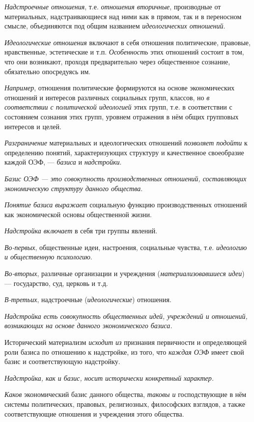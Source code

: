 \documentclass[a4paper,14pt,russian]{extreport}
\begin{document}
\emph{Надстроечные отношения}, т.е. \emph{отношения вторичные}, производные от материальных, надстраивающиеся над ними как в прямом, так и в переносном смысле, объединяются под общим названием \emph{идеологических отношений}.

\emph{Идеологические отношения} включают в себя отношения политические, правовые, нравственные, эстетические и т.п. \emph{Особенность} этих отношений состоит в том, что они возникают, проходя предварительно через общественное сознание, обязательно опосредуясь им.

\emph{Например}, отношения политические формируются на основе экономических отношений и интересов различных социальных групп, классов, но \emph{в соответствии с политической идеологией} этих групп, т.е. в соответствии с состоянием сознания этих групп, уровнем отражения в нём общих групповых интересов и целей.

\emph{Разграничение} материальных и идеологических отношений \emph{позволяет подойти} к определению понятий, характеризующих структуру и качественное своеобразие каждой ОЭФ, --- \emph{базиса} и \emph{надстройки}.

\emph{Базис ОЭФ --- это совокупность производственных отношений, составляющих экономическую структуру данного общества}.

\emph{Понятие базиса} \emph{выражает} социальную функцию производственных отношений как экономической основы общественной жизни.

\emph{Надстройка включает} в себя три группы явлений.

\emph{Во-первых}, общественные идеи, настроения, социальные чувства, т.е. \emph{идеологию и общественную психологию}.

\emph{Во-вторых}, различные организации и учреждения (\emph{материализовавшиеся идеи}) --- государство, суд, церковь и т.д.

\emph{В-третьих}, надстроечные (\emph{идеологические}) отношения.

\emph{Надстройка есть совокупность общественных идей, учреждений и отношений, возникающих на основе данного экономического базиса.}

Исторический материализм \emph{исходит из} признания первичности и определяющей роли базиса по отношению к надстройке, из того, что \emph{каждая ОЭФ} имеет свой базис и соответствующую надстройку.

\emph{Надстройка, как и базис, носит исторически конкретный характер.}

\emph{Каков} экономический базис данного общества, \emph{таковы и} господствующие в нём системы политических, правовых, религиозных, философских взглядов, а также соответствующие отношения и учреждения этого общества.
\end{document}
